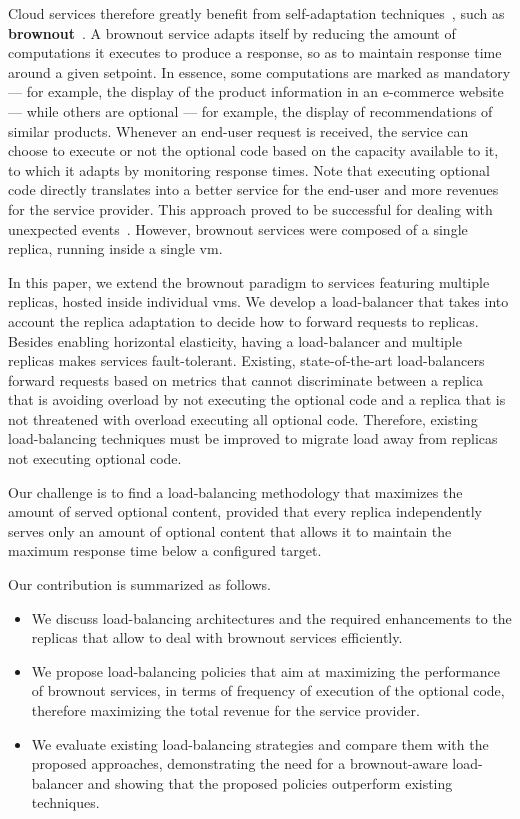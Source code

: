 Cloud services therefore greatly benefit from self-adaptation
techniques~\cite{SalehieSelfadaptive:TAAS}, such as {\bf
  brownout}~\citep{cloudish-tr}. A brownout service adapts itself by
reducing the amount of computations it executes to produce a response,
so as to maintain response time around a given setpoint.  In essence,
some computations are marked as mandatory --- for example, the display
of the product information in an e-commerce website --- while others
are optional --- for example, the display of recommendations of
similar products.  Whenever an end-user request is received, the
service can choose to execute or not the optional code based on the
capacity available to it, to which it adapts by monitoring response
times. Note that executing optional code directly translates into a
better service for the end-user and more revenues for the service
provider. This approach proved to be successful for dealing with
unexpected events~\citep{cloudish-tr}. However, brownout services were
composed of a single replica, running inside a single \ac{vm}.

In this paper, we extend the brownout paradigm to services featuring
multiple replicas, hosted inside individual \acp{vm}. We develop a
load-balancer that takes into account the replica adaptation to decide
how to forward requests to replicas.  Besides enabling horizontal
elasticity, having a load-balancer and multiple replicas makes
services fault-tolerant. Existing, state-of-the-art load-balancers
forward requests based on metrics that cannot discriminate between a
replica that is avoiding overload by not executing the optional code
and a replica that is not threatened with overload executing all
optional code. Therefore, existing load-balancing techniques must be
improved to migrate load away from replicas not executing optional
code.

Our challenge is to find a load-balancing methodology that maximizes
the amount of served optional content, provided that every replica
independently serves only an amount of optional content that allows it
to maintain the maximum response time below a configured target.

Our contribution is summarized as follows.
\begin{itemize}
\item We discuss load-balancing architectures and the required
  enhancements to the replicas that allow to deal with brownout
  services efficiently.
\item We propose load-balancing policies that aim at maximizing the
  performance of brownout services, in terms of frequency of execution
  of the optional code, therefore maximizing the total revenue for the
  service provider.
\item We evaluate existing load-balancing strategies and compare them
  with the proposed approaches, demonstrating the need for a
  brownout-aware load-balancer and showing that the proposed policies
  outperform existing techniques.
\end{itemize}
